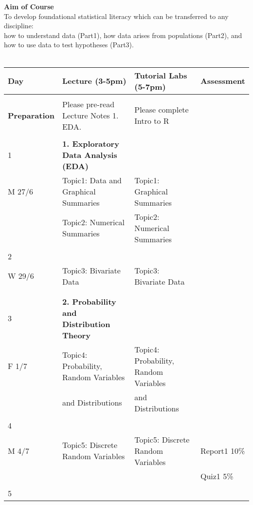 \documentclass[bigtut]{quiz}\usepackage[]{graphicx}\usepackage[]{color}
\begin{document}

\begin{tutorial}

{\bf Aim of Course}  \\
To develop foundational statistical literacy which can be transferred to any discipline: \\
how to understand data (Part1), how data arises from populations (Part2), and how to use data to test hypotheses (Part3).  \\ \\


{\small \begin{tabular}{|l|l|l|l|} \hline
{\bf Day} & {\bf Lecture (3-5pm)} \hspace{4cm} & {\bf Tutorial Labs (5-7pm)} \hspace{.4cm} & {\bf Assessment} \hspace{.2cm} \\ \hline
& & &  \\
{\bf Preparation} & Please pre-read Lecture Notes 1. EDA.  &  Please complete Intro to R  & \\ 
& & & \\ \hline
1  & {\bf 1. Exploratory Data Analysis (EDA)} &   & \\
M 27/6 & Topic1: Data and Graphical Summaries & Topic1: Graphical Summaries  & \\
& Topic2: Numerical Summaries & Topic2: Numerical Summaries & \\ 
& & & \\ \hline
2 &  & & \\
W 29/6 & Topic3: Bivariate Data & Topic3: Bivariate Data   & \\
& &  & \\ 
& & & \\ \hline
3 & {\bf 2. Probability and Distribution Theory} &    &  \\
F 1/7 & Topic4: Probability, Random Variables  & Topic4: Probability,  Random Variables  &   \\
& and Distributions & and Distributions &  \\ 
& & & \\ \hline
4 &   &  &      \\
M 4/7 & Topic5: Discrete Random Variables  & Topic5: Discrete Random Variables  & Report1 10\%    \\ 
& & & Quiz1 5\% \\ 
& & &  \\ \hline
5 &   &  & \\

\end{tabular}}
\end{tutorial}
\end{document}
